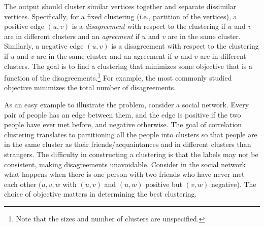 \documentclass[11pt]{article}
\begin{document}
The output should cluster similar vertices together and separate dissimilar vertices.
Specifically, for a fixed clustering (i.e., partition of the vertices), a positive edge $(u, v)$ is a \emph{disagreement} with respect to the clustering if $u$ and $v$ are in different clusters and an \emph{agreement} if $u$ and $v$ are in the same cluster.
Similarly, a negative edge $(u,v)$ is a disagreement with respect to the clustering if $u$ and $v$ are in the same cluster 
and an agreement if $u$ and $v$ are in different clusters.  
The goal is to find a clustering that minimizes some objective
that is a function of the disagreements.\footnote{Note that the sizes and number of clusters are unspecified.}
For example, the most commonly studied objective minimizes the total number of disagreements.



As an easy example to illustrate the problem,
consider a social network. Every pair of people has an edge between them, 
and the edge is positive if the two people have ever met before, and negative otherwise.
The goal of correlation clustering translates to partitioning all the people into clusters so that people are in the same cluster as their friends/acquaintances and in different clusters than strangers. 
The difficulty in constructing a clustering is that the labels may not be consistent, making disagreements unavoidable. Consider in the social network what happens when there is one person with two friends who have never met each other ($u,v,w$ with $(u,v)$ and $(u,w)$ positive but $(v,w)$ negative).
The choice of objective matters in determining the best clustering.
\end{document}
